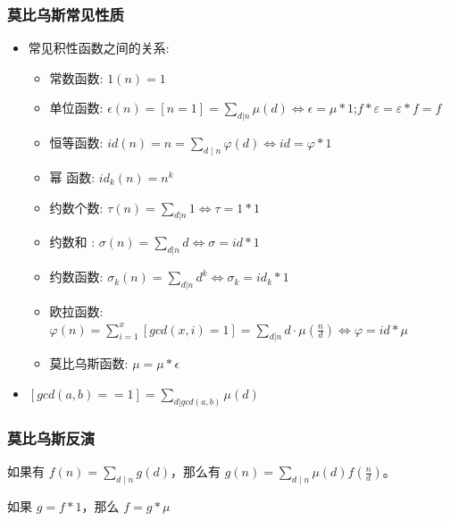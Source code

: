\subsubsection{莫比乌斯常见性质}
\begin{itemize}
    
    \item 常见积性函数之间的关系:
        \begin{itemize}
            \item 常数函数: $1(n) = 1$
            \item 单位函数: $\epsilon(n) = [n = 1] = \displaystyle\sum_{d | n}\mu(d) \Leftrightarrow \epsilon = \mu \ast 1 $;$f * \varepsilon = \varepsilon * f = f$
            \item 恒等函数: $id(n) = n = \displaystyle\sum _{d \mid n} \varphi (d) \Leftrightarrow \displaystyle id = \varphi \ast 1$
            \item 幂  函数: $id_k(n) = n^k$
            \item 约数个数: $\tau(n) = \displaystyle\sum_{d | n}1  \Leftrightarrow \tau = 1 \ast 1$
            \item 约数和  : $\sigma(n) = \displaystyle\sum_{d | n}d  \Leftrightarrow \sigma = id \ast 1$
            \item 约数函数: $\sigma_k(n) = \displaystyle\sum_{d | n}d^k  \Leftrightarrow \sigma_k = id_k \ast 1$
            \item 欧拉函数: $\varphi(n) = \displaystyle\sum_{i = 1}^x[gcd(x,i) = 1] = \displaystyle\sum_{d | n} d \cdot \mu(\frac{n}{d}) \Leftrightarrow \varphi = id \ast \mu$
            \item 莫比乌斯函数: $\mu = \mu \ast \epsilon$
        \end{itemize}

    \item $[gcd(a,b) == 1] = \sum\limits_{d | gcd(a,b)} \mu(d)$
\end{itemize}
       
\subsubsection{莫比乌斯反演}
如果有 $f(n)=\sum\limits_{d\mid n}g(d)$，那么有 $g(n)=\sum\limits_{d\mid n}\mu(d)f(\frac{n}{d})$。

如果 $g = f * 1$，那么 $f = g * \mu$

